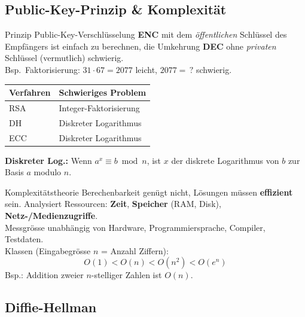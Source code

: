 \documentclass[a4paper, fontsize=7pt]{scrartcl}
\renewcommand*{\arraystretch}{1.5}  %
\begin{document}
\subsection{Public-Key-Prinzip \& Komplexität}

\begin{mainbox}{Prinzip Public-Key-Verschlüsselung}
\textbf{ENC} mit dem \emph{öffentlichen} Schlüssel des Empfängers ist einfach zu
berechnen, die Umkehrung \textbf{DEC} ohne \emph{privaten} Schlüssel (vermutlich)
schwierig.\\
Bsp.\ Faktorisierung: $31 \cdot 67 = 2077$ leicht, $2077 = \,?$ schwierig.
\renewcommand*{\arraystretch}{1.2}
\begin{center}
\begin{tabular}{l|l}
\textbf{Verfahren} & \textbf{Schwieriges Problem} \\
\hline
RSA & Integer-Faktorisierung \\
DH & Diskreter Logarithmus \\
ECC & Diskreter Logarithmus \\
\end{tabular}
\end{center}
\textbf{Diskreter Log.:} Wenn $a^x \equiv b \bmod n$, ist $x$ der diskrete
Logarithmus von $b$ zur Basis $a$ modulo $n$.
\end{mainbox}

\begin{mainbox}{Komplexitätstheorie}
Berechenbarkeit genügt nicht, Lösungen müssen \textbf{effizient} sein.
Analysiert Ressourcen: \textbf{Zeit}, \textbf{Speicher} (RAM, Disk),
\textbf{Netz-/Medienzugriffe}.\\
Messgrösse unabhängig von Hardware, Programmiersprache, Compiler, Testdaten.\\
Klassen (Eingabegrösse $n$ = Anzahl Ziffern):
$$O(1) < O(n) < O(n^2) < O(e^n)$$
Bsp.: Addition zweier $n$-stelliger Zahlen ist $O(n)$.
\end{mainbox}

\subsection{Diffie-Hellman}
\end{document}
